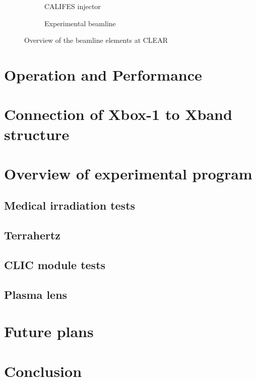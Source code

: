 \documentclass[a4paper,
               keeplastbox,   %
               ]{jacow}
\begin{document}
\begin{figure*}
    \centering
    \begin{subfigure}[h]{\textwidth}
        \centering
        
        \caption{CALIFES injector}
    \end{subfigure}
    \begin{subfigure}[h]{\textwidth}
        \centering
        
        \caption{Experimental beamline}
    \end{subfigure}
    \caption{Overview of the beamline elements at CLEAR}
\end{figure*}

\section{Operation and Performance}

\section{Connection of Xbox-1 to Xband structure}

\section{Overview of experimental program}

\subsection{Medical irradiation tests}

\subsection{Terrahertz}

\subsection{CLIC module tests}
\subsection{Plasma lens}

\section{Future plans}

\section{Conclusion}
\end{document}
